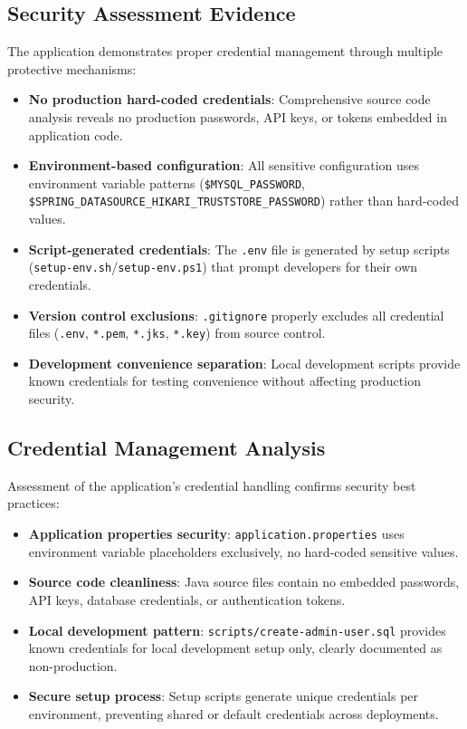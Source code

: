 \documentclass[]{UCD_CS_FYP_Report}
\begin{document}
\subsection{Security Assessment Evidence}
The application demonstrates proper credential management through multiple protective mechanisms:
\begin{itemize}
	\item \textbf{No production hard-coded credentials}: Comprehensive source code analysis reveals no production passwords, API keys, or tokens embedded in application code.
	\item \textbf{Environment-based configuration}: All sensitive configuration uses environment variable patterns (\texttt{\${MYSQL\_PASSWORD}}, \texttt{\${SPRING\_DATASOURCE\_HIKARI\_TRUSTSTORE\_PASSWORD}}) rather than hard-coded values.
	\item \textbf{Script-generated credentials}: The \texttt{.env} file is generated by setup scripts (\texttt{setup-env.sh}/\texttt{setup-env.ps1}) that prompt developers for their own credentials.
	\item \textbf{Version control exclusions}: \texttt{.gitignore} properly excludes all credential files (\texttt{.env}, \texttt{*.pem}, \texttt{*.jks}, \texttt{*.key}) from source control.
	\item \textbf{Development convenience separation}: Local development scripts provide known credentials for testing convenience without affecting production security.
\end{itemize}

\subsection{Credential Management Analysis}
Assessment of the application's credential handling confirms security best practices:
\begin{itemize}
	\item \textbf{Application properties security}: \texttt{application.properties} uses environment variable placeholders exclusively, no hard-coded sensitive values.
	\item \textbf{Source code cleanliness}: Java source files contain no embedded passwords, API keys, database credentials, or authentication tokens.
	\item \textbf{Local development pattern}: \texttt{scripts/create-admin-user.sql} provides known credentials for local development setup only, clearly documented as non-production.
	\item \textbf{Secure setup process}: Setup scripts generate unique credentials per environment, preventing shared or default credentials across deployments.
\end{itemize}
\end{document}
